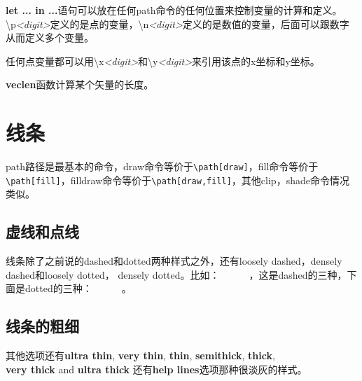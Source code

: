 \documentclass[11pt,oneside]{book}
\begin{document}
\begin{common-format}

\textbf{let ... in ...}语句可以放在任何path命令的任何位置来控制变量的计算和定义。
\textbackslash p\textit{<digit>}定义的是点的变量，\textbackslash n\textit{<digit>}定义的是数值的变量，后面可以跟数字从而定义多个变量。

任何点变量都可以用\textbackslash x\textit{<digit>}和\textbackslash y\textit{<digit>}来引用该点的x坐标和y坐标。

\textbf{veclen}函数计算某个矢量的长度。



\section{线条}
path路径是最基本的命令，draw命令等价于\verb+\path[draw]+，fill命令等价于\verb+\path[fill]+，filldraw命令等价于\verb+\path[draw,fill]+，其他clip，shade命令情况类似。

\subsection{虚线和点线}
线条除了之前说的dashed和dotted两种样式之外，还有loosely dashed，densely dashed和loosely dotted， densely dotted。比如： ~~  ~~ ，这是dashed的三种，下面是dotted的三种： ~~  ~~ 。

\subsection{线条的粗细}

其他选项还有\textbf{ultra thin}, \textbf{very thin}, \textbf{thin}, \textbf{semithick},  \textbf{thick},\\ \textbf{very thick} and \textbf{ultra thick}
还有\textbf{help lines}选项那种很淡灰的样式。


\end{common-format}
\end{document}
